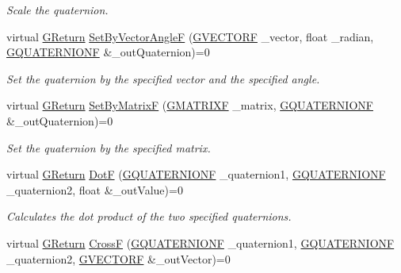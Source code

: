 \begin{DoxyCompactItemize}
\begin{DoxyCompactList}\small\item\em Scale the quaternion. \end{DoxyCompactList}\item 
virtual \hyperlink{namespaceGW_a67a839e3df7ea8a5c5686613a7a3de21}{G\+Return} \hyperlink{classGW_1_1MATH_1_1GQuaternion_a70d41e1e78ed85814b22eb4a328b6876}{Set\+By\+Vector\+AngleF} (\hyperlink{structGW_1_1MATH_1_1GVECTORF}{G\+V\+E\+C\+T\+O\+RF} \+\_\+vector, float \+\_\+radian, \hyperlink{structGW_1_1MATH_1_1GQUATERNIONF}{G\+Q\+U\+A\+T\+E\+R\+N\+I\+O\+NF} \&\+\_\+out\+Quaternion)=0
\begin{DoxyCompactList}\small\item\em Set the quaternion by the specified vector and the specified angle. \end{DoxyCompactList}\item 
virtual \hyperlink{namespaceGW_a67a839e3df7ea8a5c5686613a7a3de21}{G\+Return} \hyperlink{classGW_1_1MATH_1_1GQuaternion_aec0eb6ee4ee1557117b03a2104be21f0}{Set\+By\+MatrixF} (\hyperlink{structGW_1_1MATH_1_1GMATRIXF}{G\+M\+A\+T\+R\+I\+XF} \+\_\+matrix, \hyperlink{structGW_1_1MATH_1_1GQUATERNIONF}{G\+Q\+U\+A\+T\+E\+R\+N\+I\+O\+NF} \&\+\_\+out\+Quaternion)=0
\begin{DoxyCompactList}\small\item\em Set the quaternion by the specified matrix. \end{DoxyCompactList}\item 
virtual \hyperlink{namespaceGW_a67a839e3df7ea8a5c5686613a7a3de21}{G\+Return} \hyperlink{classGW_1_1MATH_1_1GQuaternion_a3bb06da263ec25caa24f12a054ac0bd1}{DotF} (\hyperlink{structGW_1_1MATH_1_1GQUATERNIONF}{G\+Q\+U\+A\+T\+E\+R\+N\+I\+O\+NF} \+\_\+quaternion1, \hyperlink{structGW_1_1MATH_1_1GQUATERNIONF}{G\+Q\+U\+A\+T\+E\+R\+N\+I\+O\+NF} \+\_\+quaternion2, float \&\+\_\+out\+Value)=0
\begin{DoxyCompactList}\small\item\em Calculates the dot product of the two specified quaternions. \end{DoxyCompactList}\item 
virtual \hyperlink{namespaceGW_a67a839e3df7ea8a5c5686613a7a3de21}{G\+Return} \hyperlink{classGW_1_1MATH_1_1GQuaternion_ac3ee5d4e49669083b9ea57dd408edbbe}{CrossF} (\hyperlink{structGW_1_1MATH_1_1GQUATERNIONF}{G\+Q\+U\+A\+T\+E\+R\+N\+I\+O\+NF} \+\_\+quaternion1, \hyperlink{structGW_1_1MATH_1_1GQUATERNIONF}{G\+Q\+U\+A\+T\+E\+R\+N\+I\+O\+NF} \+\_\+quaternion2, \hyperlink{structGW_1_1MATH_1_1GVECTORF}{G\+V\+E\+C\+T\+O\+RF} \&\+\_\+out\+Vector)=0

\end{DoxyCompactItemize}
